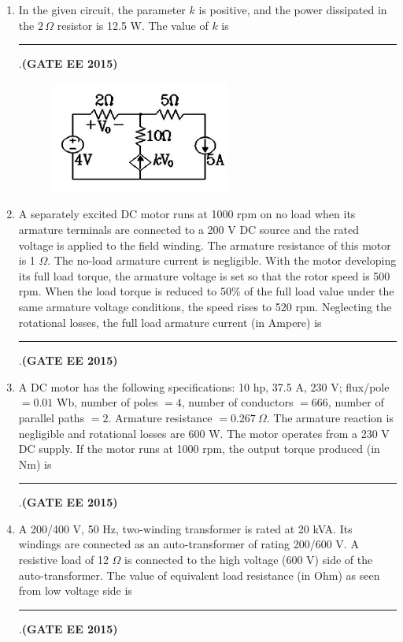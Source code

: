 \documentclass[a4paper,12pt]{exam}
\theoremstyle{remark}
\begin{document}
\begin{enumerate}
\item In the given circuit, the parameter $k$ is positive, and the power dissipated in the $2\,\Omega$ resistor is 12.5 W. The value of $k$ is \rule{2cm}{0.15mm}.\hfill{\textbf{(GATE EE 2015)}}
\begin{figure}[H]
    \centering
    \includegraphics[width=0.5\columnwidth]{figs/Q 57.png}
    \caption{}
    \label{fig:placeholder}
\end{figure}
\item A separately excited DC motor runs at 1000 rpm on no load when its armature terminals are connected to a 200 V DC source and the rated voltage is applied to the field winding. The armature resistance of this motor is 1 $\Omega$. The no-load armature current is negligible. With the motor developing its full load torque, the armature voltage is set so that the rotor speed is 500 rpm. When the load torque is reduced to 50\% of the full load value under the same armature voltage conditions, the speed rises to 520 rpm. Neglecting the rotational losses, the full load armature current (in Ampere) is \rule{3cm}{0.15mm}.\hfill{\textbf{(GATE EE 2015)}}

\item A DC motor has the following specifications: 10 hp, 37.5 A, 230 V; flux/pole $=0.01$ Wb, number of poles $=4$, number of conductors $=666$, number of parallel paths $=2$. Armature resistance $=0.267~\Omega$. The armature reaction is negligible and rotational losses are 600 W. The motor operates from a 230 V DC supply. If the motor runs at 1000 rpm, the output torque produced (in Nm) is \rule{2cm}{0.15mm}.\hfill{\textbf{(GATE EE 2015)}}

\item A 200/400 V, 50 Hz, two-winding transformer is rated at 20 kVA. Its windings are connected as an auto-transformer of rating 200/600 V. A resistive load of 12 $\Omega$ is connected to the high voltage (600 V) side of the auto-transformer. The value of equivalent load resistance (in Ohm) as seen from low voltage side is\\ \rule{3cm}{0.15mm}.\hfill{\textbf{(GATE EE 2015)}}


\end{enumerate}
\end{document}
